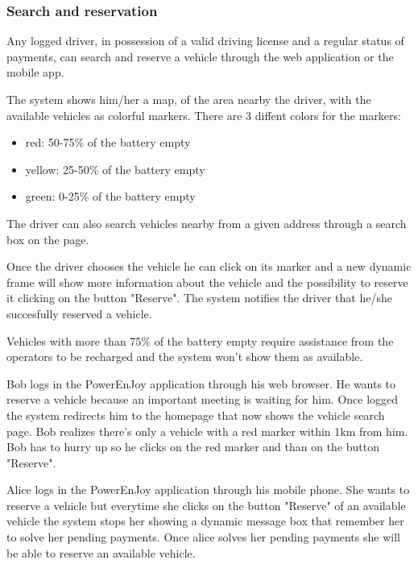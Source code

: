 \subsubsection{Search and reservation}

Any logged driver, in possession of a valid driving license and a regular status of payments, can search and reserve a vehicle through the web application or the mobile app.

The system shows him/her a map, of the area nearby the driver, with the available vehicles as colorful markers. There are 3 diffent colors for the markers:
\begin{itemize}
	\item red: 50-75\% of the battery empty
	\item yellow: 25-50\% of the battery empty
	\item green: 0-25\% of the battery empty
\end{itemize}
The driver can also search vehicles nearby from a given address through a search box on the page.

Once the driver chooses the vehicle he can click on its marker and a new dynamic frame will show more information about the vehicle and the possibility to reserve it clicking on the button "Reserve".
The system notifies the driver that he/she succesfully reserved a vehicle.

Vehicles with more than 75\% of the battery empty require assistance from the operators to be recharged and the system won't show them as available. 


Bob logs in the PowerEnJoy application through his web browser. He wants to reserve a vehicle because an important meeting is waiting for him. Once logged the system redirects him to the homepage that now shows the vehicle search page. Bob realizes there's only a vehicle with a red marker within 1km from him. Bob has to hurry up so he clicks on the red marker and than on the button "Reserve".

Alice logs in the PowerEnJoy application through his mobile phone. She wants to reserve a vehicle but everytime she clicks on the button "Reserve" of an available vehicle the system stops her showing a dynamic message box that remember her to solve her pending payments. Once alice solves her pending payments she will be able to reserve an available vehicle.

